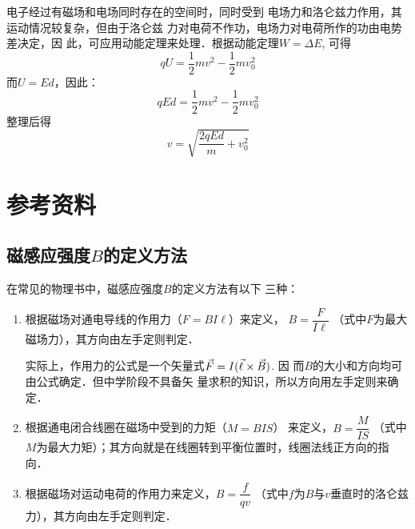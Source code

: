 \begin{enumerate}
\begin{figure}[htp]\centering
{}
	\caption{ }
\end{figure}

\begin{solution}
    电子经过有磁场和电场同时存在的空间时，同时受到
    电场力和洛仑兹力作用，其运动情况较复杂，但由于洛仑兹
    力对电荷不作功，电场力对电荷所作的功由电势差决定，因
    此，可应用动能定理来处理．根据动能定理$W=\Delta E$, 可得
\[qU=\frac{1}{2}mv^2-\frac{1}{2}mv^2_0\]
而$U=Ed$，因此：
\[qEd=\frac{1}{2}mv^2-\frac{1}{2}mv^2_0\]
整理后得
\[v=\sqrt{\frac{2qEd}{m}+v^2_0}\]
\end{solution}

\end{enumerate}



\section{参考资料}
\subsection{磁感应强度$B$的定义方法}
在常见的物理书中，磁感应强度$B$的定义方法有以下
三种：
\begin{enumerate}
    \item 根据磁场对通电导线的作用力（$F=BI\ell$）来定义，
   $B=\dfrac{F}{I\ell}$ （式中$F$为最大磁场力），其方向由左手定则判定．

    实际上，作用力的公式是一个矢量式$\vec{F}=I(\vec{\ell}\times\vec{B})$. 因
    而$B$的大小和方向均可由公式确定．但中学阶段不具备矢
    量求积的知识，所以方向用左手定则来确定．
    \item 根据通电闭合线圈在磁场中受到的力矩（$M=BIS$）
    来定义，$B=\dfrac{M}{IS}$
    （式中$M$为最大力矩）；其方向就是在线圈转到平衡位置时，线圈法线正方向的指向．
    \item 根据磁场对运动电荷的作用力来定义，$B=\dfrac{f}{qv}$
    （式中$f$为$B$与$v$垂直时的洛仑兹力），其方向由左手定则判定．
\end{enumerate}

